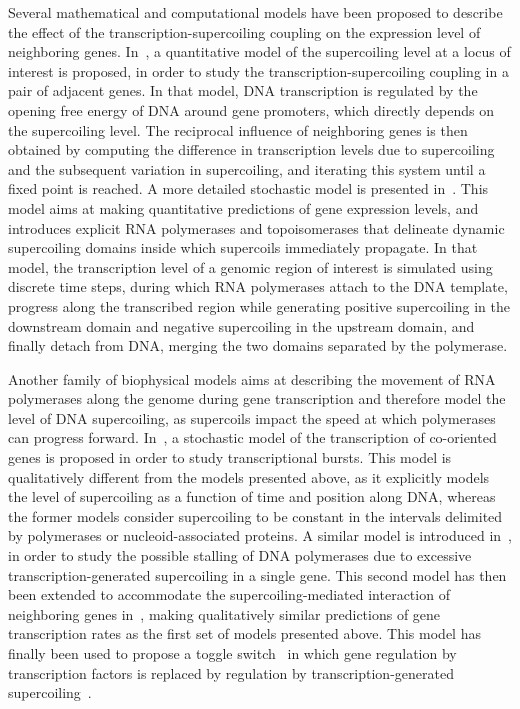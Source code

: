 Several mathematical and computational models have been proposed to describe the effect of the transcription-supercoiling coupling on the expression level of neighboring genes.
In~\cite{meyer2014}, a quantitative model of the supercoiling level at a locus of interest is proposed, in order to study the transcription-supercoiling coupling in a pair of adjacent genes.
In that model, DNA transcription is regulated by the opening free energy of DNA around gene promoters, which directly depends on the supercoiling level.
The reciprocal influence of neighboring genes is then obtained by computing the difference in transcription levels due to supercoiling and the subsequent variation in supercoiling, and iterating this system until a fixed point is reached.
A more detailed stochastic model is presented in~\cite{elhoudaigui2019}.
This model aims at making quantitative predictions of gene expression levels, and introduces explicit RNA polymerases and topoisomerases that delineate dynamic supercoiling domains inside which supercoils immediately propagate.
In that model, the transcription level of a genomic region of interest is simulated using discrete time steps, during which RNA polymerases attach to the DNA template, progress along the transcribed region while generating positive supercoiling in the downstream domain and negative supercoiling in the upstream domain, and finally detach from DNA, merging the two domains separated by the polymerase.

Another family of biophysical models aims at describing the movement of RNA polymerases along the genome during gene transcription and therefore model the level of DNA supercoiling, as supercoils impact the speed at which polymerases can progress forward.
In~\cite{brackley2016}, a stochastic model of the transcription of co-oriented genes is proposed in order to study transcriptional bursts.
This model is qualitatively different from the models presented above, as it explicitly models the level of supercoiling as a function of time and position along DNA, whereas the former models consider supercoiling to be constant in the intervals delimited by polymerases or nucleoid-associated proteins.
A similar model is introduced in~\cite{sevier2017}, in order to study the possible stalling of DNA polymerases due to excessive transcription-generated supercoiling in a single gene.
This second model has then been extended to accommodate the supercoiling-mediated interaction of neighboring genes in~\cite{sevier2018}, making qualitatively similar predictions of gene transcription rates as the first set of models presented above.
This model has finally been used to propose a toggle switch~\citep{gardner2000} in which gene regulation by transcription factors is replaced by regulation by transcription-generated supercoiling~\citep{sevier2021}.

